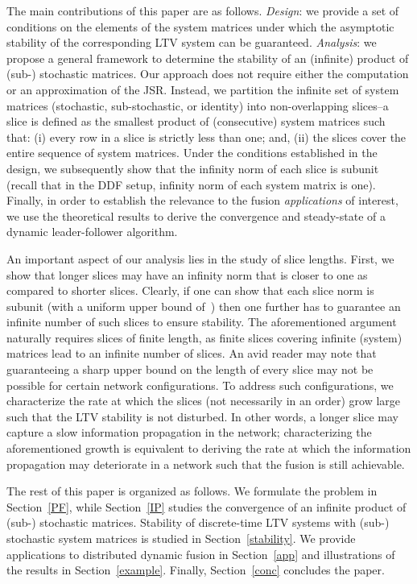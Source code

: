 \documentclass[draftclsnofoot, onecolumn, 12pt]{IEEEtran}
\begin{document}
The main contributions of this paper are as follows. \emph{Design}: we provide a set of conditions on the elements of the system matrices under which the asymptotic stability of the corresponding LTV system can be guaranteed. \emph{Analysis}: we propose a general framework to determine the stability of an (infinite) product of (sub-) stochastic matrices. Our approach does not require either the computation or an approximation of the JSR. Instead, we partition the infinite set of system matrices (stochastic, sub-stochastic, or identity) into non-overlapping slices--a slice is defined as the smallest product of (consecutive) system matrices such that: (i) every row in a slice is strictly less than one; and, (ii) the slices cover the entire sequence of system matrices. Under the conditions established in the design, we subsequently show that the infinity norm of each slice is subunit (recall that in the DDF setup, infinity norm of each system matrix is one). Finally, in order to establish the relevance to the fusion \textit{applications} of interest, we use the theoretical results to derive the convergence and steady-state of a dynamic leader-follower algorithm. 

An important aspect of our analysis lies in the study of slice lengths. First, we show that longer slices may have an infinity norm that is closer to one as compared to shorter slices. Clearly, if one can show that each slice norm is subunit (with a uniform upper bound of~) then one further has to guarantee an infinite number of such slices to ensure stability. The aforementioned argument naturally requires slices of finite length, as finite slices covering infinite (system) matrices lead to an infinite number of slices. An avid reader may note that guaranteeing a sharp upper bound on the length of every slice may not be possible for certain network configurations. To address such configurations, we characterize the rate at which the slices (not necessarily in an order) grow large such that the LTV stability is not disturbed. In other words, a longer slice may capture a slow information propagation in the network; characterizing the aforementioned growth is equivalent to deriving the rate at which the information propagation may deteriorate in a network such that the fusion is still achievable. 

The rest of this paper is organized as follows. We formulate the problem in Section~\ref{PF}, while Section~\ref{IP} studies the convergence of an infinite product of (sub-) stochastic matrices. Stability of discrete-time LTV systems with (sub-) stochastic system matrices is studied in Section~\ref{stability}. We provide applications to distributed dynamic fusion in Section~\ref{app} and illustrations of the results in Section~\ref{example}. Finally, Section~\ref{conc} concludes the paper.
\end{document}
